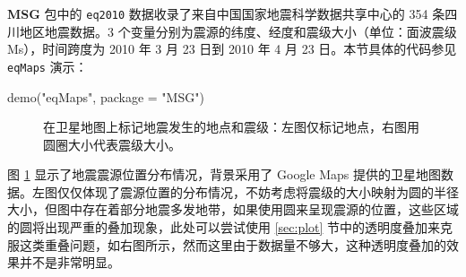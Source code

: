 \documentclass[
  b5paper,
  UTF8,twoside]{book}
\newenvironment{Shaded}{\begin{snugshade}}{\end{snugshade}}
\newcommand{\AttributeTok}[1]{\textcolor[rgb]{0.77,0.63,0.00}{#1}}
\newcommand{\FunctionTok}[1]{\textcolor[rgb]{0.00,0.00,0.00}{#1}}
\newcommand{\NormalTok}[1]{#1}
\newcommand{\StringTok}[1]{\textcolor[rgb]{0.31,0.60,0.02}{#1}}
\begin{document}
\textbf{MSG} 包中的 \texttt{eq2010} 数据收录了来自中国国家地震科学数据共享中心的 354 条四川地区地震数据。3 个变量分别为震源的纬度、经度和震级大小（单位：面波震级 Ms），时间跨度为 2010 年 3 月 23 日到 2010 年 4 月 23 日。本节具体的代码参见 \texttt{eqMaps} 演示：

\begin{Shaded}
\begin{Highlighting}[]
\FunctionTok{demo}\NormalTok{(}\StringTok{"eqMaps"}\NormalTok{, }\AttributeTok{package =} \StringTok{"MSG"}\NormalTok{)}
\end{Highlighting}
\end{Shaded}

\begin{figure}

{\centering {}

}

\caption[ 在卫星地图上标记地震发生的地点和震级 ]{在卫星地图上标记地震发生的地点和震级：左图仅标记地点，右图用圆圈大小代表震级大小。}\label{fig:RgoogleMaps}
\end{figure}



图 \ref{fig:RgoogleMaps} 显示了地震震源位置分布情况，背景采用了 Google Maps 提供的卫星地图数据。左图仅仅体现了震源位置的分布情况，不妨考虑将震级的大小映射为圆的半径大小，但图中存在着部分地震多发地带，如果使用圆来呈现震源的位置，这些区域的圆将出现严重的叠加现象，此处可以尝试使用 \ref{sec:plot} 节中的透明度叠加来克服这类重叠问题，如右图所示，然而这里由于数据量不够大，这种透明度叠加的效果并不是非常明显。
\end{document}
